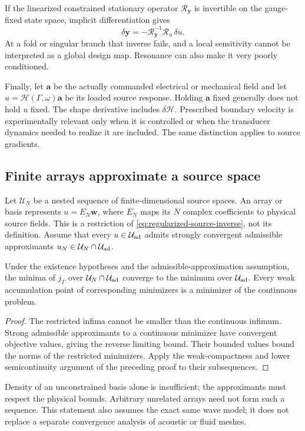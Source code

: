 If the linearized constrained stationary operator $\mathcal R_{\bm y}$ is
invertible on the gauge-fixed state space, implicit differentiation gives
\begin{equation}
 \delta\bm y=-\mathcal R_{\bm y}^{-1}
                         \mathcal R_u\,\delta u.
 \label{eq:implicit-sensitivity}
\end{equation}
At a fold or singular branch that inverse fails, and a local sensitivity cannot
be interpreted as a global design map. Resonance can also make it very poorly
conditioned.

Finally, let $\bm a$ be the actually commanded electrical or mechanical
field and let $u=\mathcal H(\Gamma,\omega)\bm a$ be its loaded source response.
Holding $\bm a$ fixed generally does not hold $u$ fixed. The shape derivative
includes $\delta\mathcal H$. Prescribed boundary velocity is experimentally
relevant only when it is controlled or when the transducer dynamics needed to
realize it are included. The same distinction applies to source gradients.

\subsection{Finite arrays approximate a source space}
Let $\mathcal U_N$ be a nested sequence of finite-dimensional source spaces.
An array or basis represents $u=E_N\bm w$, where $E_N$ maps its $N$ complex
coefficients to physical source fields. This is a restriction of
\cref{eq:regularized-source-inverse}, not its definition. Assume that every
$u\in\mathcal U_{\rm ad}$ admits strongly convergent admissible
approximants $u_N\in\mathcal U_N\cap\mathcal U_{\rm ad}$.

\begin{proposition}
Under the existence hypotheses and the admissible-approximation assumption,
the minima of $j_\Gamma$ over $\mathcal U_N\cap\mathcal U_{\rm ad}$
converge to the minimum over $\mathcal U_{\rm ad}$. Every weak accumulation
point of corresponding minimizers is a minimizer of the continuous problem.
\end{proposition}
\begin{proof}
The restricted infima cannot be smaller than the continuous infimum. Strong
admissible approximants to a continuous minimizer have convergent objective
values, giving the reverse limiting bound. Their bounded values bound the
norms of the restricted minimizers. Apply the weak-compactness and lower
semicontinuity argument of the preceding proof to their subsequences.
\end{proof}
Density of an unconstrained basis alone is insufficient; the approximants
must respect the physical bounds. Arbitrary unrelated arrays need not form
such a sequence. This statement also assumes the exact same wave model; it
does not replace a separate convergence analysis of acoustic or fluid meshes.
